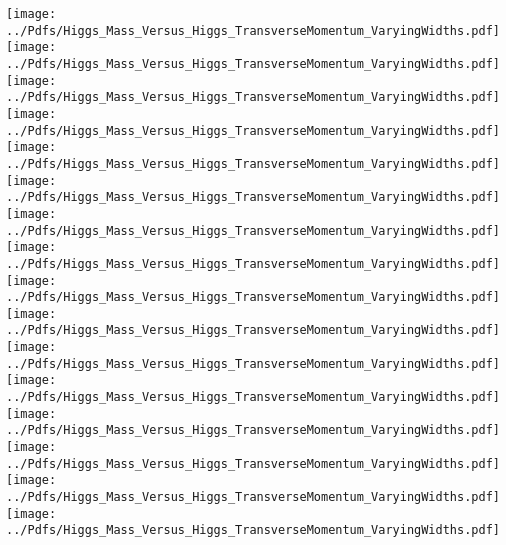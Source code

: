 \documentclass[a4wide,10pt]{article}
\begin{document}
\texttt{[image: ../Pdfs/Higgs\_Mass\_Versus\_Higgs\_TransverseMomentum\_VaryingWidths.pdf]}
\texttt{[image: ../Pdfs/Higgs\_Mass\_Versus\_Higgs\_TransverseMomentum\_VaryingWidths.pdf]}
\texttt{[image: ../Pdfs/Higgs\_Mass\_Versus\_Higgs\_TransverseMomentum\_VaryingWidths.pdf]}
\texttt{[image: ../Pdfs/Higgs\_Mass\_Versus\_Higgs\_TransverseMomentum\_VaryingWidths.pdf]}
\texttt{[image: ../Pdfs/Higgs\_Mass\_Versus\_Higgs\_TransverseMomentum\_VaryingWidths.pdf]}
\texttt{[image: ../Pdfs/Higgs\_Mass\_Versus\_Higgs\_TransverseMomentum\_VaryingWidths.pdf]}
\texttt{[image: ../Pdfs/Higgs\_Mass\_Versus\_Higgs\_TransverseMomentum\_VaryingWidths.pdf]}
\texttt{[image: ../Pdfs/Higgs\_Mass\_Versus\_Higgs\_TransverseMomentum\_VaryingWidths.pdf]}
\texttt{[image: ../Pdfs/Higgs\_Mass\_Versus\_Higgs\_TransverseMomentum\_VaryingWidths.pdf]}
\texttt{[image: ../Pdfs/Higgs\_Mass\_Versus\_Higgs\_TransverseMomentum\_VaryingWidths.pdf]}
\texttt{[image: ../Pdfs/Higgs\_Mass\_Versus\_Higgs\_TransverseMomentum\_VaryingWidths.pdf]}
\texttt{[image: ../Pdfs/Higgs\_Mass\_Versus\_Higgs\_TransverseMomentum\_VaryingWidths.pdf]}
\texttt{[image: ../Pdfs/Higgs\_Mass\_Versus\_Higgs\_TransverseMomentum\_VaryingWidths.pdf]}
\texttt{[image: ../Pdfs/Higgs\_Mass\_Versus\_Higgs\_TransverseMomentum\_VaryingWidths.pdf]}
\texttt{[image: ../Pdfs/Higgs\_Mass\_Versus\_Higgs\_TransverseMomentum\_VaryingWidths.pdf]}
\texttt{[image: ../Pdfs/Higgs\_Mass\_Versus\_Higgs\_TransverseMomentum\_VaryingWidths.pdf]}
\end{document}
